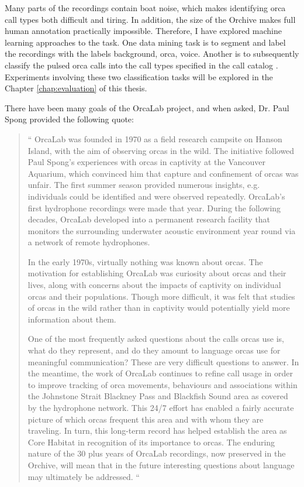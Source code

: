 Many parts of the recordings contain boat noise, which makes
identifying orca call types both difficult and tiring. In addition,
the size of the Orchive makes full human annotation practically
impossible. Therefore, I have explored machine learning approaches to
the task.  One data mining task is to segment and label the recordings
with the labels background, orca, voice. Another is to subsequently
classify the pulsed orca calls into the call types specified in the
call catalog \cite{ford1987catalogue}.  Experiments involving these
two classification tasks will be explored in the Chapter
\ref{chap:evaluation} of this thesis.

There have been many goals of the OrcaLab project, and when asked,
Dr. Paul Spong provided the following quote:

\begin{quote}
`` OrcaLab was founded in 1970 as a field research campsite on Hanson
  Island, with the aim of observing orcas in the wild. The initiative
  followed Paul Spong's experiences with orcas in captivity at the
  Vancouver Aquarium, which convinced him that capture and confinement
  of orcas was unfair. The first summer season provided numerous
  insights, e.g. individuals could be identified and were observed
  repeatedly. OrcaLab's first hydrophone recordings were made that
  year. During the following decades, OrcaLab developed into a
  permanent research facility that monitors the surrounding underwater
  acoustic environment year round via a network of remote hydrophones.

  In the early 1970s, virtually nothing was known about orcas. The
  motivation for establishing OrcaLab was curiosity about orcas and
  their lives, along with concerns about the impacts of captivity on
  individual orcas and their populations. Though more difficult, it
  was felt that studies of orcas in the wild rather than in captivity
  would potentially yield more information about them.

  One of the most frequently asked questions about the calls orcas use
  is, what do they represent, and do they amount to language orcas use
  for meaningful communication? These are very difficult questions to
  answer.  In the meantime, the work of OrcaLab continues to refine
  call usage in order to improve tracking of orca movements,
  behaviours and associations within the Johnstone Strait Blackney
  Pass and Blackfish Sound area as covered by the hydrophone network.
  This 24/7 effort has enabled a fairly accurate picture of which
  orcas frequent this area and with whom they are traveling.  In
  turn, this long-term record has helped establish the area as Core
  Habitat in recognition of its importance to orcas.  The enduring
  nature of the 30 plus years of OrcaLab recordings, now preserved in
  the Orchive, will mean that in the future interesting questions
  about language may ultimately be addressed.  ``
\end{quote}

